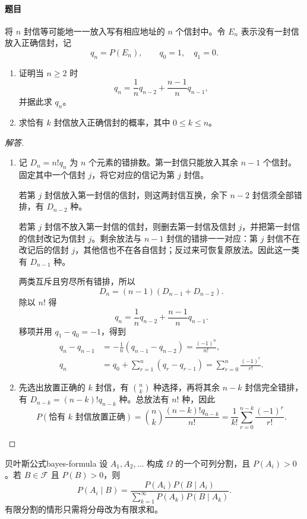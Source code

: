 \paragraph{题目}
将 $n$ 封信等可能地一一放入写有相应地址的 $n$ 个信封中。令 $E_n$ 表示没有一封信放入正确信封，记
\[q_n=P(E_n),\qquad q_0=1,\quad q_1=0.\]
\begin{enumerate}
\item 证明当 $n\geq2$ 时
\[q_n=\frac1n q_{n-2}+\frac{n-1}{n}q_{n-1},\]
并据此求 $q_n$。
\item 求恰有 $k$ 封信放入正确信封的概率，其中 $0\leq k\leq n$。
\end{enumerate}

\begin{proof}[解答]
\begin{enumerate}
\item 记 $D_n=n!q_n$ 为 $n$ 个元素的错排数。第一封信只能放入其余 $n-1$ 个信封。固定其中一个信封 $j$，将它对应的信记为第 $j$ 封信。

若第 $j$ 封信放入第一封信的信封，则这两封信互换，余下 $n-2$ 封信须全部错排，有 $D_{n-2}$ 种。

若第 $j$ 封信不放入第一封信的信封，则删去第一封信及信封 $j$，并把第一封信的信封改记为信封 $j$。剩余放法与 $n-1$ 封信的错排一一对应：第 $j$ 封信不在改记后的信封 $j$，其他信也不在各自信封；反过来可恢复原放法。因此这一类有 $D_{n-1}$ 种。

两类互斥且穷尽所有错排，所以
\[D_n=(n-1)(D_{n-1}+D_{n-2}).\]
除以 $n!$ 得
\[q_n=\frac1n q_{n-2}+\frac{n-1}{n}q_{n-1}.\]
移项并用 $q_1-q_0=-1$，得到
\begin{align*}
q_n-q_{n-1}&=-\frac1n(q_{n-1}-q_{n-2})=\frac{(-1)^n}{n!},\\
q_n&=q_0+\sum_{r=1}^n(q_r-q_{r-1})=\sum_{r=0}^n\frac{(-1)^r}{r!}.
\end{align*}
\item 先选出放置正确的 $k$ 封信，有 $\binom nk$ 种选择，再将其余 $n-k$ 封信完全错排，有 $D_{n-k}=(n-k)!q_{n-k}$ 种。总放法有 $n!$ 种，因此
\[P(\text{恰有 $k$ 封信放置正确})=\binom nk\frac{(n-k)!q_{n-k}}{n!}=\frac1{k!}\sum_{r=0}^{n-k}\frac{(-1)^r}{r!}.\]
\end{enumerate}
\end{proof}

\begin{mytheorem}{贝叶斯公式}{bayes-formula}
设 $A_1,A_2,\ldots$ 构成 $\Omega$ 的一个可列分割，且 $P(A_i)>0$。若 $B\in\mathscr{F}$ 且 $P(B)>0$，则
\[
P(A_i\mid B)
=\frac{P(A_i)P(B\mid A_i)}
{\displaystyle\sum_{k=1}^{\infty}P(A_k)P(B\mid A_k)}.
\]
有限分割的情形只需将分母改为有限求和。
\end{mytheorem}

